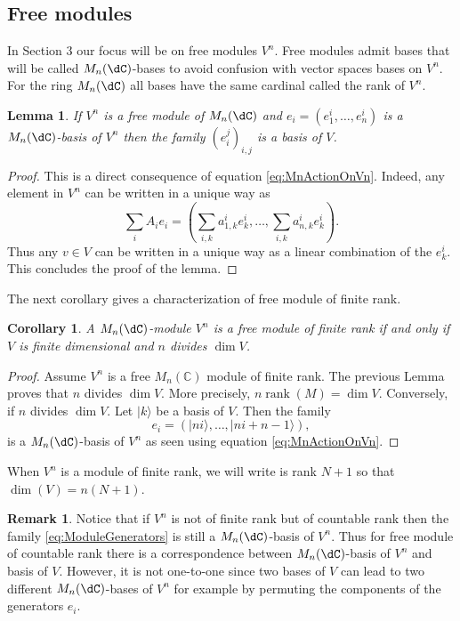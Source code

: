 \documentclass[a4paper,reqno]{amsart}
\DeclareMathOperator\rank{ rank}
\newtheorem{corollary}[theorem]{Corollary}
\newtheorem{lemma}[theorem]{Lemma}
\theoremstyle{definition}
\newtheorem{remark}[theorem]{Remark}
\numberwithin{equation}{section}
\begin{document}
\subsection{Free modules}

In Section 3 our focus will be on free modules  $V^n$. Free modules admit bases that will be called $M_n(\dC)$-bases to avoid confusion with vector spaces bases on $V^n$. For the ring $M_n(\dC)$ all bases have the same cardinal called the rank of $V^n$. 

\begin{lemma}\label{lem:FreeModuleBasis}
    If $V^n$ is a free module of $M_n(\dC)$ and $e_i=(e_1^i,\ldots, e_n^i)$ is a $M_n(\dC)$-basis of $V^n$ then the family $(e_i^j)_{i,j}$ is a basis of $V$. 
\end{lemma}
\begin{proof}
    This is a direct consequence of equation \eqref{eq:MnActionOnVn}. Indeed, any element in $V^n$ can be written in a unique way as
    \begin{equation}
    \sum_i A_i e_i =\left( \sum_{i,k}a^i_{1,k}e^i_k,\ldots, \sum_{i,k}a^i_{n,k}e^i_k\right).
    \end{equation}
    Thus any $v\in V$ can be written in a unique way as a linear combination of the $e_k^i$. This concludes the proof of the lemma.
\end{proof}
The next corollary gives a characterization of free module of finite rank. 
\begin{corollary}
\label{cor:free-ndivdimV}
A $M_n(\dC)$-module $V^n$ is a free module of finite rank if and only if $V$ is finite dimensional and $n$ divides $\dim V$. 
\end{corollary}

\begin{proof}
    Assume $V^n$ is a free $M_n(\mathbb{C})$ module of finite rank. The previous Lemma proves that $n$ divides $\dim V$. More precisely, $n \rank (M) =\dim V$. Conversely, if $n$ divides $\dim V$. Let $|k\rangle$ be a basis of $V$. Then the family 
    \begin{equation}\label{eq:ModuleGenerators}
    e_i = (|ni\rangle, \ldots, |ni+n-1\rangle),
    \end{equation}
is a $M_n(\dC)$-basis of $V^n$ as seen using equation \eqref{eq:MnActionOnVn}. 
\end{proof}
When $V^n$ is a module of finite rank, we will write is rank $N+1$ so that $\dim (V)=n(N+1)$. 


\begin{remark}
    Notice that if $V^n$ is not of finite rank but of countable rank then the family \eqref{eq:ModuleGenerators} is still a $M_n(\dC)$-basis of $V^n$. Thus for free module of countable rank there is a correspondence between $M_n(\dC)$-basis of $V^n$ and basis of $V$. However, it is not one-to-one since two bases of $V$ can lead to two different $M_n(\dC)$-bases of $V^n$ for example by permuting the components of the generators $e_i$. 
\end{remark}
\end{document}
